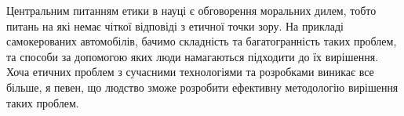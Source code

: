 Центральним питанням етики в науці є обговорення моральних дилем, тобто питань на які немає чіткої відповіді з етичної точки зору. На прикладі самокерованих автомобілів, бачимо складність та багатогранність таких проблем, та способи за допомогою яких люди намагаються підходити до їх вирішення. Хоча етичних проблем з сучасними технологіями та розробками виникає все більше, я певен, що людство зможе розробити ефективну методологію вирішення таких проблем.

